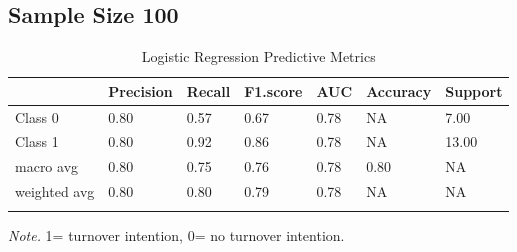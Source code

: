 \documentclass[
  man]{apa7}
\begin{document}
\subsection{Sample Size 100}\label{sample-size-100}

\begin{table}[tbp]

\begin{center}
\begin{threeparttable}

\caption{\label{tab:logitable200}Logistic Regression Predictive Metrics}

\begin{tabular}{lllllll}
\toprule
 & \multicolumn{1}{c}{Precision} & \multicolumn{1}{c}{Recall} & \multicolumn{1}{c}{F1.score} & \multicolumn{1}{c}{AUC} & \multicolumn{1}{c}{Accuracy} & \multicolumn{1}{c}{Support}\\
\midrule
Class 0 & 0.80 & 0.57 & 0.67 & 0.78 & NA & 7.00\\
Class 1 & 0.80 & 0.92 & 0.86 & 0.78 & NA & 13.00\\
macro avg & 0.80 & 0.75 & 0.76 & 0.78 & 0.80 & NA\\
weighted avg & 0.80 & 0.80 & 0.79 & 0.78 & NA & NA\\
\bottomrule
\addlinespace
\end{tabular}

\begin{tablenotes}[para]
\normalsize{\textit{Note.} 1= turnover intention, 0= no turnover intention.}
\end{tablenotes}

\end{threeparttable}
\end{center}

\end{table}
\end{document}
